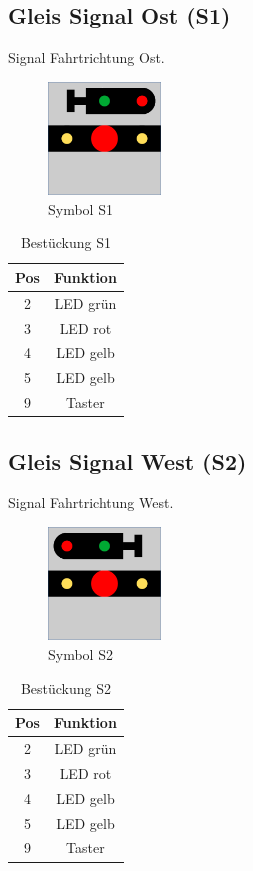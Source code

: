 \documentclass[10pt,a4paper]{article}
\begin{document}
\subsection{Gleis Signal Ost (S1)}
Signal Fahrtrichtung Ost.
\begin{figure}[hbtp]
\centering
\includegraphics[width=3cm]{../folien/s1.png}
\caption{Symbol S1}
\end{figure}
\begin{table}[h!]
\centering
\begin{tabular}{c|c}
\textbf{Pos} & \textbf{Funktion} \\ \hline
2 & LED grün \\
3 & LED rot \\
4 & LED gelb \\
5 & LED gelb \\
9 & Taster
\end{tabular}
\caption{Bestückung S1}
\end{table}


\subsection{Gleis Signal West (S2)}
Signal Fahrtrichtung West.
\begin{figure}[hbtp]
\centering
\includegraphics[width=3cm]{../folien/s2.png}
\caption{Symbol S2}
\end{figure}
\begin{table}[h!]
\centering
\begin{tabular}{c|c}
\textbf{Pos} & \textbf{Funktion} \\ \hline
2 & LED grün \\
3 & LED rot \\
4 & LED gelb \\
5 & LED gelb \\
9 & Taster
\end{tabular}
\caption{Bestückung S2}
\end{table}
\newpage
\end{document}
